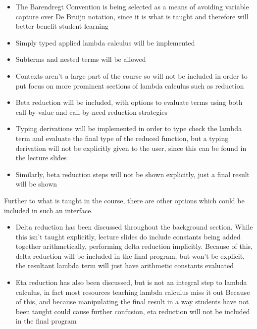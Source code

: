 \documentclass[a4paper,12pt]{report}
\begin{document}
\begin{itemize}
	\item The Barendregt Convention is being selected as a means of avoiding variable capture over De Bruijn notation, since it is what is taught and therefore will better benefit student learning
	\item Simply typed applied lambda calculus will be implemented
	\item Subterms and nested terms will be allowed
	\item Contexts aren’t a large part of the course so will not be included in order to put focus on more prominent sections of lambda calculus such as reduction
	\item Beta reduction will be included, with options to evaluate terms using both call-by-value and call-by-need reduction strategies
	\item Typing derivations will be implemented in order to type check the lambda term and evaluate the final type of the reduced function, but a typing derivation will not be explicitly given to the user, since this can be found in the lecture slides
	\item Similarly, beta reduction steps will not be shown explicitly, just a final result will be shown
\end{itemize}

Further to what is taught in the course, there are other options which could be included in such an interface.

\begin{itemize}
	\item Delta reduction has been discussed throughout the background section. While this isn’t taught explicitly, lecture slides do include constants being added together arithmetically, performing delta reduction implicitly.
	\subitem Because of this, delta reduction will be included in the final program, but won’t be explicit, the resultant lambda term will just have arithmetic constants evaluated
	\item Eta reduction has also been discussed, but is not an integral step to lambda calculus, in fact most resources teaching lambda calculus miss it out \cite{Acar2008} \cite{Barendregt2000} \cite{Gay2019} \cite{Horowitz2013} \cite{Rojas1998} \cite{Hankin2004}
	\subitem Because of this, and because manipulating the final result in a way students have not been taught could cause further confusion, eta reduction will not be included in the final program
\end{itemize}
\end{document}
